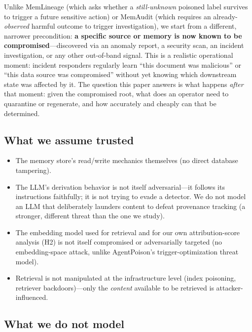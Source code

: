 Unlike MemLineage (which asks whether a \emph{still-unknown} poisoned
label survives to trigger a future sensitive action) or MemAudit (which
requires an already-\emph{observed} harmful outcome to trigger
investigation), we start from a different, narrower precondition:
\textbf{a specific source or memory is now known to be compromised}---discovered
via an anomaly report, a security scan, an incident investigation, or
any other out-of-band signal. This is a realistic operational moment:
incident responders regularly learn ``this document was malicious'' or
``this data source was compromised'' without yet knowing which
downstream state was affected by it. The question this paper answers
is what happens \emph{after} that moment: given the compromised root,
what does an operator need to quarantine or regenerate, and how
accurately and cheaply can that be determined.

\subsection{What we assume trusted}

\begin{itemize}
\item The memory store's read/write mechanics themselves (no direct
  database tampering).
\item The LLM's derivation behavior is not itself adversarial---it
  follows its instructions faithfully; it is not trying to evade a
  detector. We do not model an LLM that deliberately launders content
  to defeat provenance tracking (a stronger, different threat than the
  one we study).
\item The embedding model used for retrieval and for our own
  attribution-score analysis (H2) is not itself compromised or
  adversarially targeted (no embedding-space attack, unlike
  AgentPoison's trigger-optimization threat model).
\item Retrieval is not manipulated at the infrastructure level (index
  poisoning, retriever backdoors)---only the \emph{content} available
  to be retrieved is attacker-influenced.
\end{itemize}

\subsection{What we do not model}

